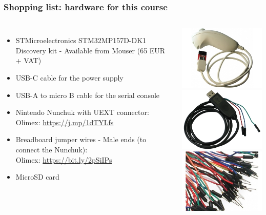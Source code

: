 \begin{frame}
\frametitle{Shopping list: hardware for this course}
  \begin{columns}
    \footnotesize
    \begin{itemize}
    \item STMicroelectronics STM32MP157D-DK1 Discovery kit -
      Available from Mouser (65 EUR + VAT)
    \item USB-C cable for the power supply
    \item USB-A to micro B cable for the serial console
    \item Nintendo Nunchuk with UEXT connector: \\
      Olimex: \url{https://j.mp/1dTYLfs}
    \item Breadboard jumper wires - Male ends (to connect the Nunchuk): \\
      Olimex: \url{https://bit.ly/2pSiIPs}
    \item MicroSD card
    \end{itemize}
    \includegraphics[height=0.25\textheight]{common/nunchuk.jpg} \\
    \includegraphics[height=0.20\textheight]{common/usb-serial-cable-female.png} \\
    \includegraphics[height=0.15\textheight]{common/jumper-wires.jpg}
    \vspace{1cm}
  \end{columns}
\end{frame}
